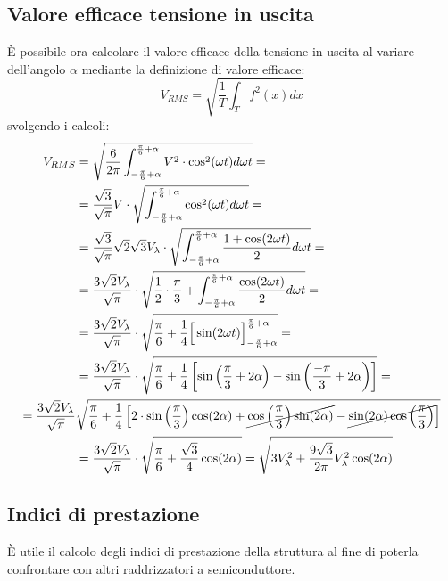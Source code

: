 \documentclass[a4paper,11pt]{article}
\begin{document}
\subsection{Valore efficace tensione in uscita}
È possibile ora calcolare il valore efficace della tensione in uscita al variare 
dell'angolo \(\alpha\) mediante la definizione di valore efficace:
\begin{equation}
V_{RMS} = \sqrt{\frac{1}{T}\int_T f^2(x)dx}
\end{equation}
svolgendo i calcoli:
\begin{align*}
V_{RMS} &= \sqrt{\frac{6}{2\pi}\int_{-\frac{\pi}{6}+\alpha}^{\frac{\pi}{6}+\alpha}V^2\cdot \cos^2(\omega t) d\omega t  } = \\
&= \frac{\sqrt{3}}{\sqrt{\pi}}V \cdot \sqrt{\int_{-\frac{\pi}{6}+\alpha}^{\frac{\pi}{6}+\alpha} \cos^2(\omega t) d\omega t  } = \\
&= \frac{\sqrt{3}}{\sqrt{\pi}}\sqrt{2} \sqrt{3} V_\lambda\cdot \sqrt{\int_{-\frac{\pi}{6}+\alpha}^{\frac{\pi}{6}+\alpha} \frac{1+\cos(2\omega t)}{2}d\omega t } = \\
&= \frac{3\sqrt{2}V_{\lambda}}{\sqrt{\pi}}\cdot \sqrt{\frac{1}{2}\cdot\frac{\pi}{3} + \int_{-\frac{\pi}{6}+\alpha}^{\frac{\pi}{6}+\alpha} \frac{\cos(2\omega t)}{2}d\omega t } =\\
&= \frac{3\sqrt{2}V_{\lambda}}{\sqrt{\pi}}\cdot \sqrt{ \frac{\pi}{6} +\frac{1}{4}\Big[\sin(2\omega t)\Big]_{-\frac{\pi}{6}+\alpha}^{\frac{\pi}{6}+\alpha} } =\\
&= \frac{3\sqrt{2}V_{\lambda}}{\sqrt{\pi}}\cdot \sqrt{\frac{\pi}{6} + \frac{1}{4}\left[\sin\left(\frac{\pi}{3}+2\alpha\right) - \sin\left(\frac{-\pi}{3}+2\alpha\right)\right] }= \\
= \frac{3\sqrt{2}V_{\lambda}}{\sqrt{\pi}}&\sqrt{\frac{\pi}{6} + \frac{1}{4}\left[2\cdot\sin\left(\frac{\pi}{3}\right)\cos(2\alpha) + \cancel{\cos\left(\frac{\pi}{3}\right)\sin(2\alpha)} -\cancel{\sin(2\alpha)\cos\left(\frac{\pi}{3}\right)} \right]  }\\
&=\frac{3\sqrt{2}V_{\lambda}}{\sqrt{\pi}}\cdot \sqrt{\frac{\pi}{6} + \frac{\sqrt{3}}{4}\cos(2\alpha) } = \sqrt{3V_\lambda^2 + \frac{9\sqrt{3}}{2\pi}V_\lambda^2\cos(2\alpha)}
\end{align*}

\subsection{Indici di prestazione}
È utile il calcolo degli indici di prestazione della struttura al fine di poterla
confrontare con altri raddrizzatori a semiconduttore.
\end{document}
